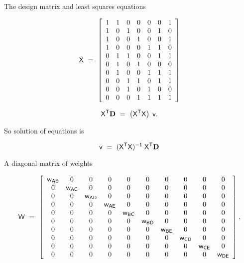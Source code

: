 \documentclass[bluish,slideColor,colorBG,pdf]{prosper}
\begin{document}
\begin{slide}[Replace]{The design matrix and least squares equations}

\[
\mathsf{X\  =\  \left[
\begin{array}{c c c c c c c}
1 & 1 & 0 & 0 & 0 & 0 & 1 \\
1 & 0 & 1 & 0 & 0 & 1 & 0 \\
1 & 0 & 0 & 1 & 0 & 0 & 1 \\
1 & 0 & 0 & 0 & 1 & 1 & 0 \\
0 & 1 & 1 & 0 & 0 & 1 & 1 \\
0 & 1 & 0 & 1 & 0 & 0 & 0 \\
0 & 1 & 0 & 0 & 1 & 1 & 1 \\
0 & 0 & 1 & 1 & 0 & 1 & 1 \\
0 & 0 & 1 & 0 & 1 & 0 & 0 \\
0 & 0 & 0 & 1 & 1 & 1 & 1
\end{array}
\right]
}\]

\[
\mathsf{\mathsf{X}^T {\bf D}\  =\  \left(X^T X\right)\;v.}
\]

So solution of equations is

\[
\mathsf{v \ = \ (X^T X)^{-1}\;X^T {\bf D}}
\]

\end{slide}

\begin{slide}[Replace]{A diagonal matrix of weights}

\[
\mathsf{W \ = \ \left[
\begin{array}{c c c c c c c c c c}
\mathsf{w_{AB}} & 0 & 0 & 0 & 0 & 0 & 0 & 0 & 0 & 0 \\
0 & \mathsf{w_{AC}} & 0 & 0 & 0 & 0 & 0 & 0 & 0 & 0 \\
0 & 0 & \mathsf{w_{AD}} & 0 & 0 & 0 & 0 & 0 & 0 & 0 \\
0 & 0 & 0 & \mathsf{w_{AE}} & 0 & 0 & 0 & 0 & 0 & 0 \\
0 & 0 & 0 & 0 & \mathsf{w_{BC}} & 0 & 0 & 0 & 0 & 0 \\
0 & 0 & 0 & 0 & 0 & \mathsf{w_{BD}} & 0 & 0 & 0 & 0 \\
0 & 0 & 0 & 0 & 0 & 0 & \mathsf{w_{BE}} & 0 & 0 & 0 \\
0 & 0 & 0 & 0 & 0 & 0 & 0 & \mathsf{w_{CD}} & 0 & 0 \\
0 & 0 & 0 & 0 & 0 & 0 & 0 & 0 & \mathsf{w_{CE}} & 0 \\
0 & 0 & 0 & 0 & 0 & 0 & 0 & 0 & 0 & \mathsf{w_{DE}} \\
\end{array}
\right],
}\]

\end{slide}
\end{document}
